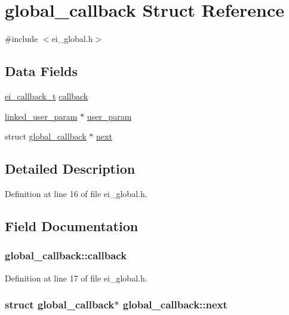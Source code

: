 \hypertarget{structglobal__callback}{
\section{global\_\-callback Struct Reference}
\label{structglobal__callback}
}


{\ttfamily \#include $<$ei\_\-global.h$>$}\subsection*{Data Fields}
\begin{DoxyCompactItemize}
\item 
\hyperlink{ei__widget_8h_a3692fee0affca071917f22f2ec2018a4}{ei\_\-callback\_\-t} \hyperlink{structglobal__callback_a33402245e5f1856b67bd33d9d7890ed1}{callback}
\item 
\hyperlink{structlinked__user__param}{linked\_\-user\_\-param} $\ast$ \hyperlink{structglobal__callback_afe70c332da30e95b0e3cdf2ce7230e25}{user\_\-param}
\item 
struct \hyperlink{structglobal__callback}{global\_\-callback} $\ast$ \hyperlink{structglobal__callback_a55becbfe2d37fbd7f97bf369c224c917}{next}
\end{DoxyCompactItemize}


\subsection{Detailed Description}


Definition at line 16 of file ei\_\-global.h.

\subsection{Field Documentation}
\hypertarget{structglobal__callback_a33402245e5f1856b67bd33d9d7890ed1}{
\subsubsection[{callback}]{ {\bf global\_\-callback::callback}}}
\label{structglobal__callback_a33402245e5f1856b67bd33d9d7890ed1}


Definition at line 17 of file ei\_\-global.h.\hypertarget{structglobal__callback_a55becbfe2d37fbd7f97bf369c224c917}{
\subsubsection[{next}]{\setlength{\rightskip}{0pt plus 5cm}struct {\bf global\_\-callback}$\ast$ {\bf global\_\-callback::next}}}
\label{structglobal__callback_a55becbfe2d37fbd7f97bf369c224c917}


